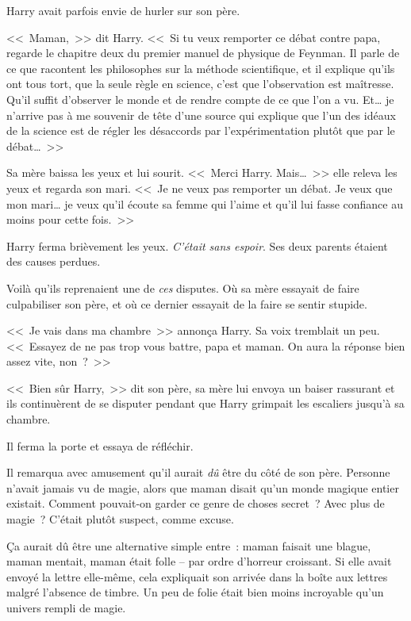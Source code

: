 Harry avait parfois envie de hurler sur son père.

<<~Maman,~>> dit Harry. <<~Si tu veux remporter ce débat contre papa, regarde le chapitre deux du premier manuel de physique de Feynman. Il parle de ce que racontent les philosophes sur la méthode scientifique, et il explique qu'ils ont tous tort, que la seule règle en science, c'est que l'observation est maîtresse. Qu'il suffit d'observer le monde et de rendre compte de ce que l'on a vu. Et\ldots{} je n'arrive pas à me souvenir de tête d'une source qui explique que l'un des idéaux de la science est de régler les désaccords par l'expérimentation plutôt que par le débat\ldots~>>

Sa mère baissa les yeux et lui sourit. <<~Merci Harry. Mais\ldots~>> elle releva les yeux et regarda son mari. <<~Je ne veux pas remporter un débat. Je veux que mon mari\ldots{} je veux qu'il écoute sa femme qui l'aime et qu'il lui fasse confiance au moins pour cette fois.~>>

Harry ferma brièvement les yeux. \emph{C'était sans espoir}. Ses deux parents étaient des causes perdues.

Voilà qu'ils reprenaient une de \emph{ces} disputes. Où sa mère essayait de faire culpabiliser son père, et où ce dernier essayait de la faire se
sentir stupide.

<<~Je vais dans ma chambre~>> annonça Harry. Sa voix tremblait un peu. <<~Essayez de ne pas trop vous battre, papa et maman. On aura la réponse bien assez vite, non~?~>>

<<~Bien sûr Harry,~>> dit son père, sa mère lui envoya un baiser rassurant et ils continuèrent de se disputer pendant que Harry grimpait les escaliers jusqu'à sa chambre.

Il ferma la porte et essaya de réfléchir.

Il remarqua avec amusement qu'il aurait \emph{dû} être du côté de son père. Personne n'avait jamais vu de magie, alors que maman disait qu'un monde magique entier existait. Comment pouvait-on garder ce genre de choses secret~? Avec plus de magie~? C'était plutôt suspect, comme excuse. 

Ça aurait dû être une alternative simple entre~: maman faisait une blague, maman mentait, maman était folle -- par ordre d'horreur croissant. Si elle avait envoyé la lettre elle-même, cela expliquait son arrivée dans la boîte aux lettres malgré l'absence de timbre. Un peu de folie était bien moins incroyable qu'un univers rempli de magie. 

